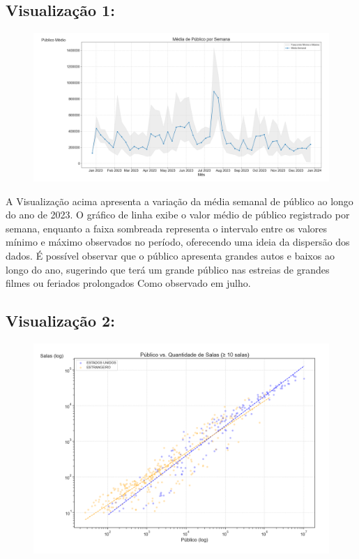 \documentclass{article}
\begin{document}
\subsection*{Visualização 1:}
\begin{figure}[H]
    \centerline{\includegraphics[width =\linewidth]{img/Figure_1.png}}
\end{figure}

A Visualização acima apresenta a variação da média semanal de público ao longo do ano de 2023. O gráfico de linha exibe o valor médio de público registrado por semana, enquanto a faixa sombreada representa o intervalo entre os valores mínimo e máximo observados no período, oferecendo uma ideia da dispersão dos dados. É possível observar que o público apresenta grandes autos e baixos ao longo do ano, sugerindo que terá um grande público nas estreias de grandes filmes ou feriados prolongados Como observado em julho.
\subsection*{Visualização 2:}
\begin{figure}[H]
    \centerline{\includegraphics[width = \linewidth]{img/Figure_2.png}}
\end{figure}
\end{document}
